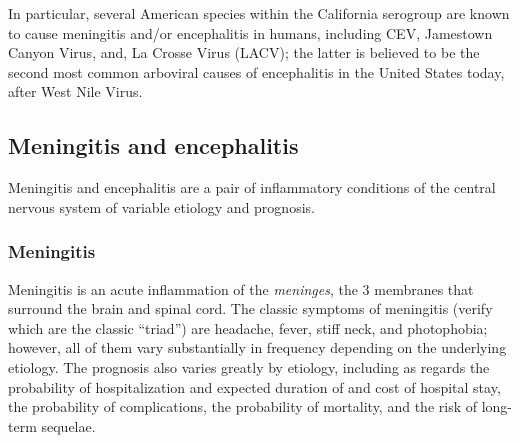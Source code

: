 \documentclass[12pt]{article}
\newcommand{\cjh}{\textcolor{blue}{cjh}}
\newcommand{\msg}[3]{(#1 $\rightarrow$ #2: #3)}
\newcommand{\mcc}[1]{\msg\cjh\cjh{#1}}
\begin{document}
        In particular, several American species within the California serogroup are known to cause meningitis and/or encephalitis in humans, including CEV, Jamestown Canyon Virus, and, La Crosse Virus (LACV); the latter is believed to be the second most common arboviral causes of encephalitis in the United States today, after West Nile Virus.

        \subsection{Meningitis and encephalitis}
            \label{m-and-e}
            Meningitis and encephalitis are a pair of inflammatory conditions of the central nervous system of variable etiology and prognosis.
            
            \subsubsection{Meningitis}
                \label{meningitis}
            Meningitis is an acute inflammation of the \textit{meninges}, the 3 membranes that surround the brain and spinal cord. The classic symptoms of meningitis (verify which are the classic ``triad'') are headache, fever, stiff neck, and photophobia; however, all of them vary substantially in frequency depending on the underlying etiology. The prognosis also varies greatly by etiology, including as regards the probability of hospitalization and expected duration of and cost of hospital stay, the probability of complications, the probability of mortality, and the risk of long-term sequelae.
\end{document}
